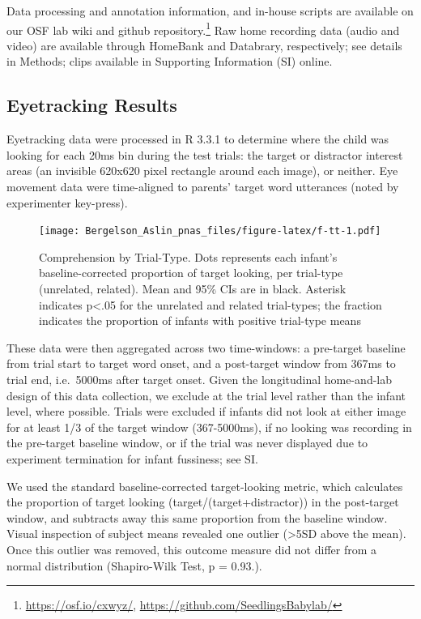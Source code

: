\documentclass[9pt,twocolumn,twoside,]{pnas-new}
\begin{document}
Data processing and annotation information, and in-house scripts are
available on our OSF lab wiki and github repository.\footnote{\url{https://osf.io/cxwyz/},
  \url{https://github.com/SeedlingsBabylab/}} Raw home recording data
(audio and video) are available through HomeBank and Databrary,
respectively; see details in Methods; clips available in Supporting
Information (SI) online.

\subsection*{Eyetracking Results}\label{eyetrackingresults}

Eyetracking data were processed in R 3.3.1 to determine where the child
was looking for each 20ms bin during the test trials: the target or
distractor interest areas (an invisible 620x620 pixel rectangle around
each image), or neither. Eye movement data were time-aligned to parents'
target word utterances (noted by experimenter key-press).

\begin{figure}[htbp]
\centering
\texttt{[image: Bergelson\_Aslin\_pnas\_files/figure-latex/f-tt-1.pdf]}
\caption{\label{fig:f-tt}Comprehension by Trial-Type. Dots represents
each infant's baseline-corrected proportion of target looking, per
trial-type (unrelated, related). Mean and 95\% CIs are in black.
Asterisk indicates p\textless{}.05 for the unrelated and related
trial-types; the fraction indicates the proportion of infants with
positive trial-type means}
\end{figure}

These data were then aggregated across two time-windows: a pre-target
baseline from trial start to target word onset, and a post-target window
from 367ms to trial end, i.e.~5000ms after target onset. Given the
longitudinal home-and-lab design of this data collection, we exclude at
the trial level rather than the infant level, where possible. Trials
were excluded if infants did not look at either image for at least 1/3
of the target window (367-5000ms), if no looking was recording in the
pre-target baseline window, or if the trial was never displayed due to
experiment termination for infant fussiness; see SI.

We used the standard baseline-corrected target-looking metric, which
calculates the proportion of target looking (target/(target+distractor))
in the post-target window, and subtracts away this same proportion from
the baseline window. Visual inspection of subject means revealed one
outlier (\textgreater{}5SD above the mean). Once this outlier was
removed, this outcome measure did not differ from a normal distribution
(Shapiro-Wilk Test, p = 0.93.).
\end{document}
